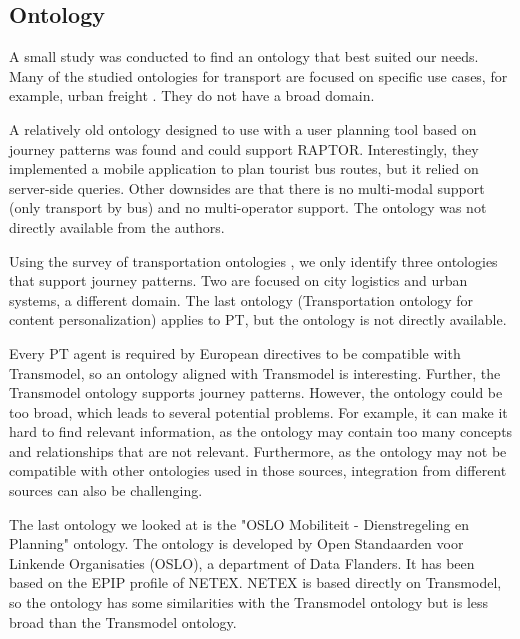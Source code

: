 \subsection{Ontology}

A small study was conducted to find an ontology that best suited our needs. Many of the studied ontologies for transport are focused on specific use cases, for example, urban freight \cite{BOUHANA20153724}. They do not have a broad domain. 

A relatively old ontology designed to use with a user planning tool based on journey patterns \cite{5507372} was found and could support RAPTOR. Interestingly, they implemented a mobile application to plan tourist bus routes, but it relied on server-side queries. Other downsides are that there is no multi-modal support (only transport by bus) and no multi-operator support. The ontology was not directly available from the authors.

Using the survey of transportation ontologies \cite{Katsumi2018Apr}, we only identify three ontologies that support journey patterns. Two are focused on city logistics and urban systems, a different domain. The last ontology (Transportation ontology for content personalization) applies to PT, but the ontology is not directly available.

Every PT agent is required by European directives to be compatible with Transmodel, so an ontology aligned with Transmodel is interesting. Further, the Transmodel ontology supports journey patterns. However, the ontology could be too broad, which leads to several potential problems. For example, it can make it hard to find relevant information, as the ontology may contain too many concepts and relationships that are not relevant. Furthermore, as the ontology may not be compatible with other ontologies used in those sources, integration from different sources can also be challenging.

The last ontology we looked at is the "OSLO Mobiliteit - Dienstregeling en Planning" \cite{osloflanders} ontology. The ontology is developed by Open Standaarden voor Linkende Organisaties (OSLO), a department of Data Flanders. It has been based on the EPIP profile of NETEX. NETEX is based directly on Transmodel, so the ontology has some similarities with the Transmodel ontology but is less broad than the Transmodel ontology.

